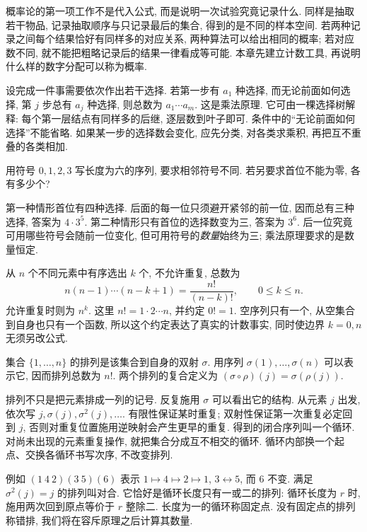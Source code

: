 
概率论的第一项工作不是代入公式, 而是说明一次试验究竟记录什么. 同样是抽取若干物品, 记录抽取顺序与只记录最后的集合, 得到的是不同的样本空间. 若两种记录之间每个结果恰好有同样多的对应关系, 两种算法可以给出相同的概率; 若对应数不同, 就不能把粗略记录后的结果一律看成等可能. 本章先建立计数工具, 再说明什么样的数字分配可以称为概率.

设完成一件事需要依次作出若干选择. 若第一步有 $a_1$ 种选择, 而无论前面如何选择, 第 $j$ 步总有 $a_j$ 种选择, 则总数为 $a_1\cdots a_m$. 这是乘法原理. 它可由一棵选择树解释: 每个第一层结点有同样多的后继, 逐层数到叶子即可. 条件中的``无论前面如何选择''不能省略. 如果某一步的选择数会变化, 应先分类, 对各类求乘积, 再把互不重叠的各类相加.

\begin{example}
用符号 $0,1,2,3$ 写长度为六的序列, 要求相邻符号不同. 若另要求首位不能为零, 各有多少个?
\end{example}
\begin{solution}
第一种情形首位有四种选择. 后面的每一位只须避开紧邻的前一位, 因而总有三种选择, 答案为 $4\cdot3^5$. 第二种情形只有首位的选择数变为三, 答案为 $3^6$. 后一位究竟可用哪些符号会随前一位变化, 但可用符号的\emph{数量}始终为三; 乘法原理要求的是数量恒定.
\end{solution}

从 $n$ 个不同元素中有序选出 $k$ 个, 不允许重复, 总数为
\[
 n(n-1)\cdots(n-k+1)=\frac{n!}{(n-k)!},\qquad 0\leq k\leq n.
\]
允许重复时则为 $n^k$. 这里 $n!=1\cdot2\cdots n$, 并约定 $0!=1$. 空序列只有一个, 从空集合到自身也只有一个函数, 所以这个约定表达了真实的计数事实, 同时使边界 $k=0,n$ 无须另改公式.

\begin{definition}
集合 $\{1,\ldots,n\}$ 的排列是该集合到自身的双射 $\sigma$. 用序列 $\sigma(1),\ldots,\sigma(n)$ 可以表示它, 因而排列总数为 $n!$. 两个排列的复合定义为 $(\sigma\circ\rho)(j)=\sigma(\rho(j))$.
\end{definition}
排列不只是把元素排成一列的记号. 反复施用 $\sigma$ 可以看出它的结构. 从元素 $j$ 出发, 依次写 $j,\sigma(j),\sigma^2(j),\ldots$. 有限性保证某时重复; 双射性保证第一次重复必定回到 $j$, 否则对重复位置施用逆映射会产生更早的重复. 得到的闭合序列叫一个循环. 对尚未出现的元素重复操作, 就把集合分成互不相交的循环. 循环内部换一个起点、交换各循环书写次序, 不改变排列.

例如 $(1\ 4\ 2)(3\ 5)(6)$ 表示 $1\mapsto4\mapsto2\mapsto1$, $3\leftrightarrow5$, 而 $6$ 不变. 满足 $\sigma^2(j)=j$ 的排列叫对合. 它恰好是循环长度只有一或二的排列: 循环长度为 $r$ 时, 施用两次回到原点等价于 $r$ 整除二. 长度为一的循环称固定点. 没有固定点的排列称错排, 我们将在容斥原理之后计算其数量.

